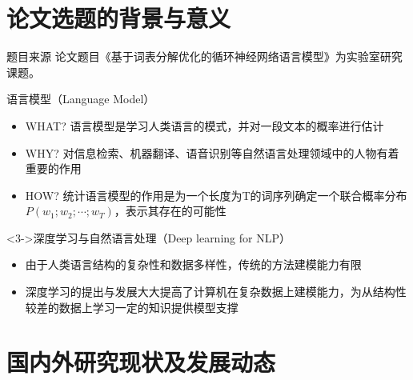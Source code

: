 \documentclass[14pt]{Bredelebeamer}
\begin{document}
\section{论文选题的背景与意义}
\begin{frame}{题目来源}
  论文题目《基于词表分解优化的循环神经网络语言模型》为实验室研究课题。
  \pause
  \begin{block}{语言模型（Language Model）}
    \begin{itemize}
      \item WHAT? 语言模型是学习人类语言的模式，并对一段文本的概率进行估计
      \item WHY? 对信息检索、机器翻译、语音识别等自然语言处理领域中的人物有着重要的作用
      \item HOW? 统计语言模型的作用是为一个长度为T的词序列确定一个联合概率分布$P(w_1;w_2; \cdots ;w_T)$，表示其存在的可能性
    \end{itemize}
  \end{block}
  \pause
  \begin{block}<3->{深度学习与自然语言处理（Deep learning for NLP）}
    \begin{itemize}
      \item 由于人类语言结构的复杂性和数据多样性，传统的方法建模能力有限
      \item 深度学习的提出与发展大大提高了计算机在复杂数据上建模能力，为从结构性较差的数据上学习一定的知识提供模型支撑
    \end{itemize}
  \end{block}
\end{frame}

\section{国内外研究现状及发展动态}
\end{document}
